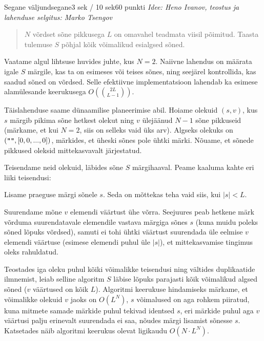 \begin{yl}{6}{Segane väljund}{segane}{3 sek / 10 sek}{60 punkti}
  \emph{Idee: Heno Ivanov, teostus ja lahenduse selgitus: Marko Tsengov}
  
  \begin{quote}
    $N$ võrdset sõne pikkusega $L$ on omavahel teadmata viisil põimitud. Taasta tulemuse $S$ põhjal kõik võimalikud esialgsed sõned.
  \end{quote}

  Vaatame algul lihtsuse huvides juhte, kus $N = 2$. Naiivne lahendus on määrata igale $S$ märgile, kas ta on esimeses või teises sõnes, ning seejärel kontrollida, kas saadud sõned on võrdsed. Selle efektiivne implementatsioon lahendab ka esimese alamülesande keerukusega $O\left( \binom{2L}{L - 1} \right)$.

  Täislahenduse saame dünaamilise planeerimise abil. Hoiame olekuid $(s, v)$, kus $s$ märgib pikima sõne hetkest olekut ning $v$ ülejäänud $N - 1$ sõne pikkuseid (märkame, et kui $N = 2$, siis on selleks vaid üks arv). Algseks olekuks on $(\verb|""|, [0, 0, ..., 0])$, märkides, et üheski sõnes pole ühtki märki. Nõuame, et sõnede pikkused oleksid mittekasvavalt järjestatud.

  Teisendame neid olekuid, läbides sõne $S$ märgihaaval. Peame kaaluma kahte eri liiki teisendusi:
  \begin{xenum}
    \item Lisame praeguse märgi sõnele $s$. Seda on mõttekas teha vaid siis, kui $|s| < L$.
    \item Suurendame mõne $v$ elemendi väärtust ühe võrra. Seejuures peab hetkene märk võrduma suurendatavale elemendile vastava märgiga sõnes $s$ (kuna muidu poleks sõned lõpuks võrdsed), samuti ei tohi ühtki väärtust suurendada üle eelmise $v$ elemendi väärtuse (esimese elemendi puhul üle $|s|$), et mittekasvamise tingimus oleks rahuldatud.
  \end{xenum}

  Teostades iga oleku puhul kõiki võimalikke teisendusi ning vältides duplikaatide ilmnemist, leiab selline algoritm $S$ läbise lõpuks parajasti kõik võimalikud algsed sõned ($v$ väärtused on kõik $L$). Algoritmi keerukuse hindamiseks märkame, et võimalikke olekuid $v$ jaoks on $O(L^N)$, $s$ võimalused on aga rohkem piiratud, kuna mitmete samade märkide puhul tekivad identsed $s$, eri märkide puhul aga $v$ väärtusi palju erinevalt suurendada ei saa, nõudes märgi lisamist sõnesse $s$. Katsetades näib algoritmi keerukus olevat ligikaudu $O(N \cdot L^N)$.
\end{yl}
